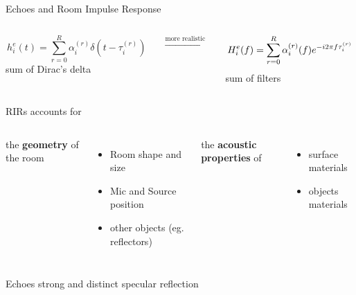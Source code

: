 \begin{frame}{Echoes and Room Impulse Response}
    \vspace{2mm}
    \pause
    \begin{columns}[onlytextwidth]
        \begin{column}{0.45\textwidth}
            \centering
            \begin{equation*}
                h_i^e(t) = \sum_{r=0}^{R} \alpha_i^{(r)} \delta(t - \tau_i^{(r)})
            \end{equation*}
            {\small sum of Dirac's delta}
        \end{column}%
        \pause
        \begin{column}{0.05\textwidth}
            \centering
            $\overset{\text{more realistic}}{\longrightarrow}$
        \end{column}%
        \begin{column}{0.45\textwidth}
            \centering
            \begin{equation*}
                H_i^e(f) = \sum_{r=0}^{R} \alpha_i^{(r)}(f) {e}^{-{i} 2 \pi f \tau_i^{(r)}}
            \end{equation*}
            {\small sum of filters}
        \end{column}
    \end{columns}

    \pause
    \vfill
    \begin{block}{RIRs accounts for}

        \vspace{3mm}
        \begin{columns}[T,onlytextwidth]
            the \textbf{geometry} of the room
            \begin{itemize}
                \item \alert{Room shape and size}
                \item \alert{Mic and Source position}
                \item other objects (eg. reflectors)
            \end{itemize}
            the \textbf{acoustic properties} of
            \begin{itemize}
                \item surface materials
                \item objects materials
            \end{itemize}
        \end{columns}
    \end{block}

    \pause
    \begin{mydefblock}{Echoes}
        \centering
        strong and distinct specular reflection
    \end{mydefblock}

\end{frame}

